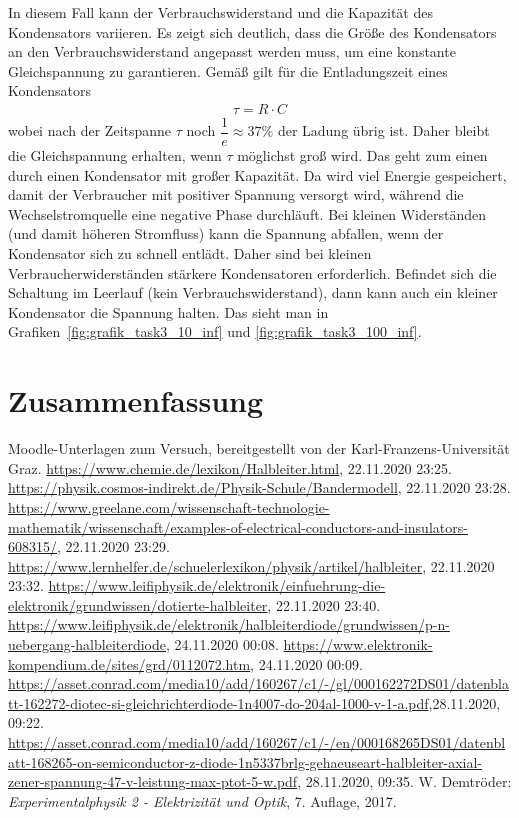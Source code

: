 \documentclass{article}
\begin{document}
In diesem Fall kann der Verbrauchswiderstand und die Kapazität des Kondensators variieren. Es zeigt sich deutlich, dass die Größe des Kondensators an den Verbrauchswiderstand angepasst werden muss, um eine konstante Gleichspannung zu garantieren. Gemäß \cite{demtroeder} gilt für die Entladungszeit eines Kondensators
\begin{align*}
\tau = R\cdot C
\end{align*}
wobei nach der Zeitspanne $\tau$ noch $\dfrac{1}{e} \approx 37\%$ der Ladung übrig ist. Daher bleibt die Gleichspannung erhalten, wenn $\tau$ möglichst groß wird. Das geht zum einen durch einen Kondensator mit großer Kapazität. Da wird viel Energie gespeichert, damit der Verbraucher mit positiver Spannung versorgt wird, während die Wechselstromquelle eine negative Phase durchläuft. Bei kleinen Widerständen (und damit höheren Stromfluss) kann die Spannung abfallen, wenn der Kondensator sich zu schnell entlädt. Daher sind bei kleinen Verbraucherwiderständen stärkere Kondensatoren erforderlich. Befindet sich die Schaltung im Leerlauf (kein Verbrauchswiderstand), dann kann auch ein kleiner Kondensator die Spannung halten. Das sieht man in Grafiken~\ref{fig:grafik_task3_10_inf} und \ref{fig:grafik_task3_100_inf}.




\section{Zusammenfassung}




\begin{thebibliography}{9}
 Moodle-Unterlagen zum Versuch, bereitgestellt von der Karl-Franzens-Universität Graz.
 \url{https://www.chemie.de/lexikon/Halbleiter.html}, 22.11.2020 23:25.
 \url{https://physik.cosmos-indirekt.de/Physik-Schule/Bandermodell}, 22.11.2020 23:28.
 \url{https://www.greelane.com/wissenschaft-technologie-mathematik/wissenschaft/examples-of-electrical-conductors-and-insulators-608315/}, 22.11.2020 23:29.
 \url{https://www.lernhelfer.de/schuelerlexikon/physik/artikel/halbleiter}, 22.11.2020 23:32.
 \url{https://www.leifiphysik.de/elektronik/einfuehrung-die-elektronik/grundwissen/dotierte-halbleiter}, 22.11.2020 23:40.
 \url{https://www.leifiphysik.de/elektronik/halbleiterdiode/grundwissen/p-n-uebergang-halbleiterdiode}, 24.11.2020 00:08.
 \url{https://www.elektronik-kompendium.de/sites/grd/0112072.htm}, 24.11.2020 00:09.
 \url{https://asset.conrad.com/media10/add/160267/c1/-/gl/000162272DS01/datenblatt-162272-diotec-si-gleichrichterdiode-1n4007-do-204al-1000-v-1-a.pdf},28.11.2020, 09:22.
 \url{https://asset.conrad.com/media10/add/160267/c1/-/en/000168265DS01/datenblatt-168265-on-semiconductor-z-diode-1n5337brlg-gehaeuseart-halbleiter-axial-zener-spannung-47-v-leistung-max-ptot-5-w.pdf}, 28.11.2020, 09:35.
 W. Demtröder: \emph{Experimentalphysik 2 - Elektrizität  und Optik}, 7. Auflage, 2017.
\end{thebibliography}
\end{document}
